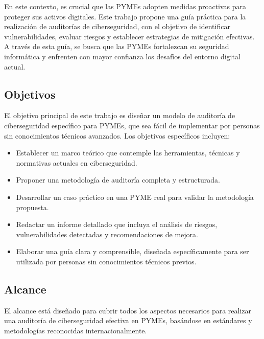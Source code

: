 \documentclass[a4paper, 10pt]{article}
\begin{document}
En este contexto, es crucial que las PYMEs adopten medidas proactivas para proteger sus activos digitales. Este trabajo propone una guía práctica para la realización de auditorías de ciberseguridad, con el objetivo de identificar vulnerabilidades, evaluar riesgos y establecer 
estrategias de mitigación efectivas. A través de esta guía, se busca que las PYMEs fortalezcan su seguridad informática y enfrenten con mayor confianza los desafíos del entorno digital actual.

\clearpage



\subsection{Objetivos}

El objetivo principal de este trabajo es dise\~nar un modelo de auditor\'ia de ciberseguridad  espec\'ifico para PYMEs, que sea f\'acil de implementar por personas sin conocimientos t\'ecnicos avanzados. Los objetivos espec\'ificos incluyen:

\begin{itemize}
    \item Establecer un marco te\'orico que contemple las herramientas, t\'ecnicas y normativas actuales en ciberseguridad.
    \item Proponer una metodolog\'ia de auditor\'ia completa y estructurada.
    \item Desarrollar un caso pr\'actico en una PYME real para validar la metodolog\'ia propuesta.
    \item Redactar un informe detallado que incluya el an\'alisis de riesgos, vulnerabilidades detectadas y recomendaciones de mejora.
    \item Elaborar una guía clara y comprensible, diseñada específicamente para ser utilizada por personas sin conocimientos técnicos previos.
\end{itemize}

\subsection{Alcance}

El alcance está diseñado para cubrir todos los aspectos necesarios para realizar una auditoría de ciberseguridad efectiva en PYMEs, basándose en estándares y metodologías reconocidas internacionalmente.
\end{document}

